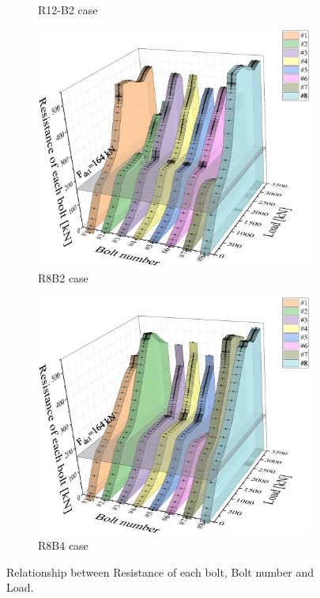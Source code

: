 \begin{figure}[htbp]
\begin{subfigure}[t]{0.49\linewidth}
        \caption{R12-B2 case}
        \label{fig-r12b23d}  
    \end{subfigure}
    \hfill
    \begin{subfigure}[t]{0.49\linewidth}
        \includegraphics[width=\linewidth]{imgs/ch5/R8B2-3d.eps}
        \caption{R8B2 case}
        \label{fig-r8b23d}
    \end{subfigure}
    \hfill
    \begin{subfigure}[t]{0.49\linewidth}
        \includegraphics[width=\linewidth]{imgs/ch5/R8B4-3d.eps}
        \caption{R8B4 case}
        \label{fig-r8b43d}  
    \end{subfigure}
\caption{Relationship between Resistance of each bolt, Bolt number and Load.}
\label{fig-load3d}
\end{figure}

